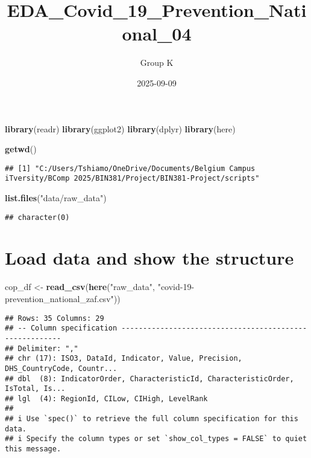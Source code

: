 \documentclass[
]{article}
\title{EDA\_Covid\_19\_Prevention\_National\_04}
\author{Group K}
\date{2025-09-09}
\newenvironment{Shaded}{\begin{snugshade}}{\end{snugshade}}
\newcommand{\FunctionTok}[1]{\textcolor[rgb]{0.13,0.29,0.53}{\textbf{#1}}}
\newcommand{\NormalTok}[1]{#1}
\newcommand{\OtherTok}[1]{\textcolor[rgb]{0.56,0.35,0.01}{#1}}
\newcommand{\StringTok}[1]{\textcolor[rgb]{0.31,0.60,0.02}{#1}}
\begin{document}
\maketitle

\begin{Shaded}
\begin{Highlighting}[]
\FunctionTok{library}\NormalTok{(readr)}
\FunctionTok{library}\NormalTok{(ggplot2)}
\FunctionTok{library}\NormalTok{(dplyr)}
\FunctionTok{library}\NormalTok{(here)}

\FunctionTok{getwd}\NormalTok{()}
\end{Highlighting}
\end{Shaded}

\begin{verbatim}
## [1] "C:/Users/Tshiamo/OneDrive/Documents/Belgium Campus iTversity/BComp 2025/BIN381/Project/BIN381-Project/scripts"
\end{verbatim}

\begin{Shaded}
\begin{Highlighting}[]
\FunctionTok{list.files}\NormalTok{(}\StringTok{"data/raw\_data"}\NormalTok{)}
\end{Highlighting}
\end{Shaded}

\begin{verbatim}
## character(0)
\end{verbatim}

\section{Load data and show the
structure}\label{load-data-and-show-the-structure}

\begin{Shaded}
\begin{Highlighting}[]
\NormalTok{cop\_df }\OtherTok{\textless{}{-}} \FunctionTok{read\_csv}\NormalTok{(}\FunctionTok{here}\NormalTok{(}\StringTok{"raw\_data"}\NormalTok{, }\StringTok{"covid{-}19{-}prevention\_national\_zaf.csv"}\NormalTok{))}
\end{Highlighting}
\end{Shaded}

\begin{verbatim}
## Rows: 35 Columns: 29
## -- Column specification --------------------------------------------------------
## Delimiter: ","
## chr (17): ISO3, DataId, Indicator, Value, Precision, DHS_CountryCode, Countr...
## dbl  (8): IndicatorOrder, CharacteristicId, CharacteristicOrder, IsTotal, Is...
## lgl  (4): RegionId, CILow, CIHigh, LevelRank
## 
## i Use `spec()` to retrieve the full column specification for this data.
## i Specify the column types or set `show_col_types = FALSE` to quiet this message.
\end{verbatim}
\end{document}
